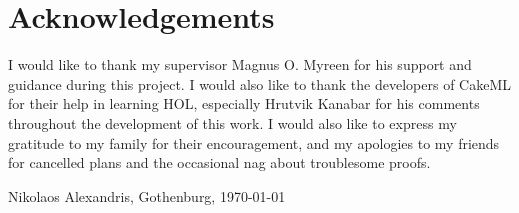 \thispagestyle{plain}			%
\section*{Acknowledgements}
I would like to thank my supervisor Magnus O. Myreen for his support and
guidance during this project. I would also like to thank the developers of
CakeML for their help in learning HOL, especially Hrutvik Kanabar for his
comments throughout the development of this work. I would also like to
express my gratitude to my family for their encouragement, and my apologies to
my friends for cancelled plans and the occasional nag about troublesome proofs.

\vspace{1.5cm}
\hfill
Nikolaos Alexandris, Gothenburg, \today

\newpage				%
\thispagestyle{empty}
\mbox{}
